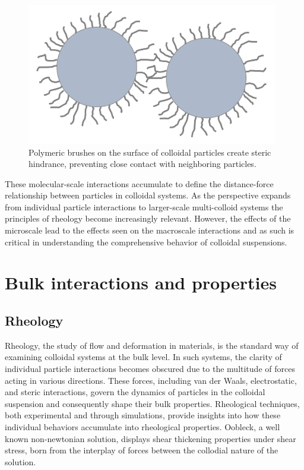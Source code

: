 \begin{figure}[h!!!!]
    \centering
    \includegraphics[width=110mm]{chapter1/brushy.PNG}
    \caption{Polymeric brushes on the surface of colloidal particles create steric hindrance, preventing close contact with neighboring particles.}
    \label{fig:brushy}
\end{figure}

These molecular-scale interactions accumulate to define the distance-force relationship between particles in colloidal systems. As the perspective expands from individual particle interactions to larger-scale multi-colloid systems the principles of rheology become increasingly relevant. However, the effects of the microscale lead to the effects seen on the macroscale interactions and as such is critical in understanding the comprehensive behavior of colloidal suspensions. \cite{C0SM00444H}



\section{Bulk interactions and properties}

\subsection{Rheology}
Rheology, the study of flow and deformation in materials, is the standard way of examining colloidal systems at the bulk level. In such systems, the clarity of individual particle interactions becomes obscured due to the multitude of forces acting in various directions. These forces, including van der Waals, electrostatic, and steric interactions, govern the dynamics of particles in the colloidal suspension and consequently shape their bulk properties. Rheological techniques, both experimental and through simulations, provide insights into how these individual behaviors accumulate into rheological properties. Oobleck, a well known non-newtonian solution, displays shear thickening properties under shear stress, born from the interplay of forces between the collodial nature of the solution.

